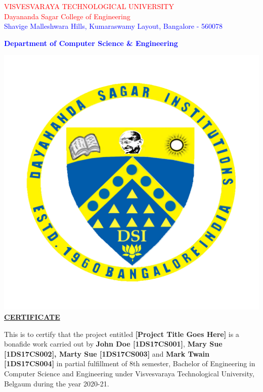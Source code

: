 \documentclass[ 12pt,a4paper,twocolumn,fleqn]{article}
\begin{document}
\newpage
  \pagestyle{fancy}
\thisfancypage{%
  \setlength{\fboxsep}{20pt}\doublebox}{}
\begin{center}
\textcolor{red}{\LARGE{VISVESVARAYA TECHNOLOGICAL UNIVERSITY}} \\
\textcolor{red}{\LARGE{Dayananda Sagar College of Engineering}} \\
\textcolor{blue}{\Large{Shavige Malleshwara Hills, Kumaraswamy Layout, Bangalore - 560078}} \\
\begin{flushleft}
\textcolor{blue}{\LARGE{\textbf{Department of Computer Science \& Engineering}}} \\
\end{flushleft}
\includegraphics[scale=0.4]{media/DSCE-min.png} \\
\Large{\underline{\textbf{CERTIFICATE}}} \\
  \end{center}
\normalsize
This is to certify that the project entitled \textbf{[Project Title Goes Here]} is a bonafide work carried out by \textbf{John Doe [1DS17CS001]}, \textbf{Mary Sue [1DS17CS002], Marty Sue [1DS17CS003]} and \textbf{Mark Twain [1DS17CS004]} in partial fulfillment of 8th semester, Bachelor of Engineering in Computer Science and Engineering under Visvesvaraya Technological University, Belgaum during the year 2020-21. \\
\end{document}
